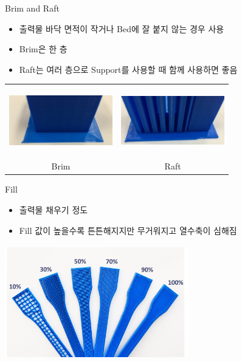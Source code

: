 \documentclass[11pt]{beamer}
\begin{document}
\begin{frame}[t]{Brim and Raft}\footnotesize
\begin{itemize}
\item 출력물 바닥 면적이 작거나 Bed에 잘 붙지 않는 경우 사용
\item Brim은 한 층
\item Raft는 여러 층으로 Support를 사용할 때 함께 사용하면 좋음
\end{itemize}
\begin{tabular}{cc}
\includegraphics[width=4.5cm, height=3cm]{./image/13_01.jpg}& \includegraphics[width=4.5cm, height=3cm]{./image/13_02.jpg}\\
Brim&Raft
\end{tabular}
\end{frame}

\begin{frame}[t]{Fill}\footnotesize
\begin{itemize}
\item 출력물 채우기 정도
\item Fill 값이 높을수록 튼튼해지지만 무거워지고 열수축이 심해짐
\end{itemize}
\centering
\includegraphics[width=8cm, height=5cm]{./image/14_01.png}
\end{frame}
\end{document}
